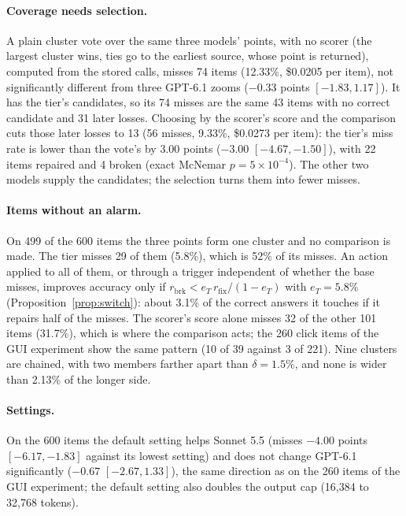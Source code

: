 \paragraph{Coverage needs selection.} A plain cluster vote over the same three models' points, with no scorer (the largest cluster wins, ties go to the earliest source, whose point is returned), computed from the stored calls, misses 74 items (12.33\%, \$0.0205 per item), not significantly different from three GPT-6.1 zooms ($-0.33$ points $[-1.83,1.17]$). It has the tier's candidates, so its 74 misses are the same 43 items with no correct candidate and 31 later losses. Choosing by the scorer's score and the comparison cuts those later losses to 13 (56 misses, 9.33\%, \$0.0273 per item): the tier's miss rate is lower than the vote's by 3.00 points ($-3.00$ $[-4.67,-1.50]$), with 22 items repaired and 4 broken (exact McNemar $p=5\times10^{-4}$). The other two models supply the candidates; the selection turns them into fewer misses.

\paragraph{Items without an alarm.} On 499 of the 600 items the three points form one cluster and no comparison is made. The tier misses 29 of them (5.8\%), which is 52\% of its misses. An action applied to all of them, or through a trigger independent of whether the base misses, improves accuracy only if $r_{\mathrm{brk}}<e_T\,r_{\mathrm{fix}}/(1-e_T)$ with $e_T=5.8\%$ (Proposition~\ref{prop:switch}): about 3.1\% of the correct answers it touches if it repairs half of the misses. The scorer's score alone misses 32 of the other 101 items (31.7\%), which is where the comparison acts; the 260 click items of the GUI experiment show the same pattern (10 of 39 against 3 of 221). Nine clusters are chained, with two members farther apart than $\delta=1.5\%$, and none is wider than 2.13\% of the longer side.

\paragraph{Settings.} On the 600 items the default setting helps Sonnet 5.5 (misses $-4.00$ points $[-6.17,-1.83]$ against its lowest setting) and does not change GPT-6.1 significantly ($-0.67$ $[-2.67,1.33]$), the same direction as on the 260 items of the GUI experiment; the default setting also doubles the output cap (16,384 to 32,768 tokens).

